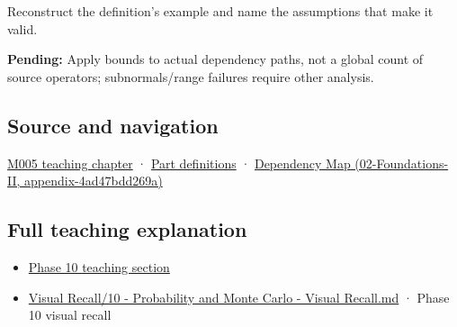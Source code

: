 Reconstruct the definition's example and name the assumptions that make it valid.

\textbf{Pending:} Apply bounds to actual dependency paths, not a global count of source operators; subnormals/range failures require other analysis.

\subsection{Source and navigation}\label{source-and-navigation}

\href{Continuous\%20Notes/Computing\%20Foundations\%20-\%20From\%20Bits\%20to\%20C++\%20and\%20Systems\%20APIs\#When\%20arithmetic\%20meets\%20uncertainty}{M005 teaching chapter} · \hyperref[appendix-fd090d982a15]{Part definitions} · \href{}{Dependency Map (02-Foundations-II, appendix-4ad47bdd269a)}

\subsection{Full teaching explanation}\label{full-teaching-explanation}

\begin{itemize}
\tightlist
\item
  \href{Continuous\%20Notes/Computing\%20Foundations\%20-\%20From\%20Bits\%20to\%20C++\%20and\%20Systems\%20APIs\#9.\%20Finite\%20samples\%20need\%20stable\%20descriptive\%20statistics}{Phase 10 teaching section}
\item
  \hyperref[appendix-cb5af353ef77]{Visual Recall/10 - Probability and Monte Carlo - Visual Recall.md} · Phase 10 visual recall
\end{itemize}
